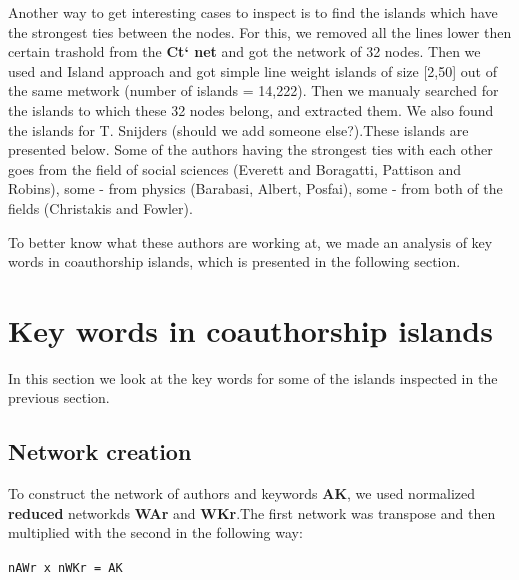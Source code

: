 \documentclass[11pt]{article} %
\begin{document}

Another way to get interesting cases to inspect is to find the islands which have the strongest ties between the nodes. For this, we removed all the lines lower then certain trashold from the \textbf{Ct` net} and got the network of 32 nodes. Then we used and Island approach and got simple line weight islands of size [2,50] out of the same metwork (number of islands = 14,222). Then we manualy searched for the islands to which these 32 nodes belong, and extracted them. We also found the islands for T. Snijders (should we add someone else?).These islands are presented below. Some of the authors having the strongest ties with each other goes from the field of social sciences (Everett and Boragatti, Pattison and Robins), some - from physics (Barabasi, Albert, Posfai), some - from both of the fields (Christakis and Fowler). \medskip

To better know what these authors are working at, we made an analysis of key words in coauthorship islands, which is presented in the following section.  \medskip



\section{Key words in coauthorship islands}

In this section we look at the key words for some of the islands inspected in the previous section. 

\subsection{Network creation}  

To construct the network of authors and keywords \textbf{AK}, we used normalized \textbf{reduced} networkds \textbf{WAr} and \textbf{WKr}.The first network was transpose and then multiplied with the second in the following way: \medskip

\texttt{nAWr x nWKr = AK}
\end{document}
